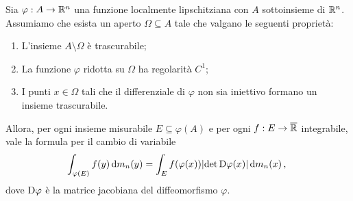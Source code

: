 \begin{corollary}\label{cor:CambioVariabileSporco}
	Sia $\varphi:A\to\mathbb R^n$ una funzione localmente lipschitziana con $A$ sottoinsieme di $\mathbb R^n$.
	Assumiamo che esista un aperto $\Omega\subseteq A$ tale che valgano le seguenti proprietà:
	\begin{enumerate}
		\item L'insieme $A\setminus \Omega$ è trascurabile;
		\item La funzione $\varphi$ ridotta su $\Omega$ ha regolarità $C^1$;
		\item I punti $x\in\Omega$ tali che il differenziale di $\varphi$ non sia iniettivo formano un insieme trascurabile.
	\end{enumerate}
	
	Allora, per ogni insieme misurabile $E\subseteq \varphi(A)$ e per ogni $f:E\to\overline{\mathbb R}$ integrabile, vale la formula per il cambio di variabile
	\begin{equation*}
		\int_{\varphi(E)} f(y)\,\mathrm d m_n(y) = \int_{E} f(\varphi(x))\lvert \det \mathrm D \varphi(x) \rvert \,\mathrm d m_n(x) \, \text{, }
	\end{equation*}
	dove $\mathrm D \varphi$ è la matrice jacobiana del diffeomorfismo $\varphi$.
\end{corollary}
